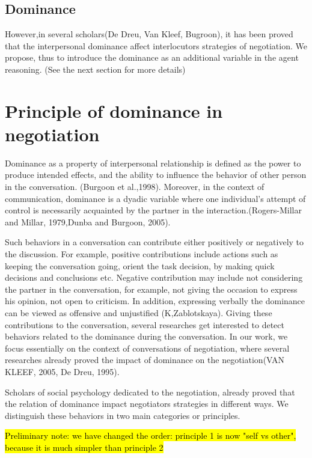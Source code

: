 \documentclass{article}
\begin{document}
\subsection{Dominance}

However,in several scholars(De Dreu, Van Kleef, Bugroon), it has been proved that the interpersonal dominance affect interlocutors strategies of negotiation. We propose, thus to introduce the dominance as an additional variable in the agent reasoning. (See the next section for more details)


\section{Principle of dominance in negotiation}
\par Dominance as a property of interpersonal relationship is defined as the power to produce intended effects, and the ability to influence the behavior of other person in the conversation. (Burgoon et al.,1998).
Moreover, in the context of communication, dominance is a dyadic variable where one individual's attempt of control is necessarily acquainted by the partner in the interaction.(Rogers-Millar and Millar, 1979,Dunba and Burgoon, 2005). 

\par Such behaviors in a conversation can contribute either positively or negatively to the discussion. For example, positive contributions include actions such as keeping the conversation going, orient the task decision, by making quick decisions and conclusions etc. Negative contribution may include not considering the partner in the conversation, for example, not giving the occasion to express his opinion, not open to criticism. In addition, expressing verbally the dominance can be viewed as offensive and unjustified (K,Zablotskaya). Giving these contributions to the conversation, several researches get interested to detect  behaviors related to the dominance during the conversation. In our work, we focus essentially on the context of conversations of negotiation, where several researches already proved the impact of dominance on the negotiation(VAN KLEEF, 2005, De Dreu, 1995). 

\par Scholars of social psychology dedicated to the negotiation, already proved that the relation of dominance impact negotiators strategies in different ways. We distinguish these behaviors in two main categories or principles.

\hl{Preliminary note: we have changed the order: principle 1 is now "self vs other", because it is much simpler than principle 2}
\end{document}
